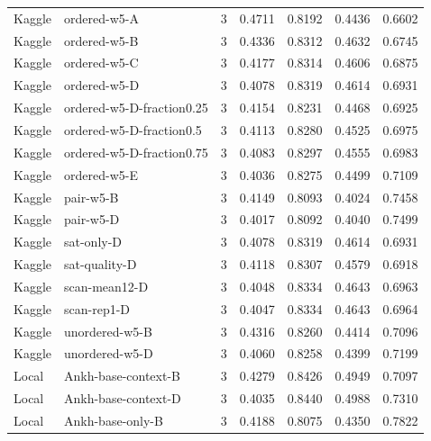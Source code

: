 \begin{longtable}{@{}P{1.35cm}P{5.3cm}rrrrr@{}}
Kaggle & ordered-\allowbreak{}w5-\allowbreak{}A & 3 & 0.4711 & 0.8192 & 0.4436 & 0.6602 \\
Kaggle & ordered-\allowbreak{}w5-\allowbreak{}B & 3 & 0.4336 & 0.8312 & 0.4632 & 0.6745 \\
Kaggle & ordered-\allowbreak{}w5-\allowbreak{}C & 3 & 0.4177 & 0.8314 & 0.4606 & 0.6875 \\
Kaggle & ordered-\allowbreak{}w5-\allowbreak{}D & 3 & 0.4078 & 0.8319 & 0.4614 & 0.6931 \\
Kaggle & ordered-\allowbreak{}w5-\allowbreak{}D-\allowbreak{}fraction0.25 & 3 & 0.4154 & 0.8231 & 0.4468 & 0.6925 \\
Kaggle & ordered-\allowbreak{}w5-\allowbreak{}D-\allowbreak{}fraction0.5 & 3 & 0.4113 & 0.8280 & 0.4525 & 0.6975 \\
Kaggle & ordered-\allowbreak{}w5-\allowbreak{}D-\allowbreak{}fraction0.75 & 3 & 0.4083 & 0.8297 & 0.4555 & 0.6983 \\
Kaggle & ordered-\allowbreak{}w5-\allowbreak{}E & 3 & 0.4036 & 0.8275 & 0.4499 & 0.7109 \\
Kaggle & pair-\allowbreak{}w5-\allowbreak{}B & 3 & 0.4149 & 0.8093 & 0.4024 & 0.7458 \\
Kaggle & pair-\allowbreak{}w5-\allowbreak{}D & 3 & 0.4017 & 0.8092 & 0.4040 & 0.7499 \\
Kaggle & sat-\allowbreak{}only-\allowbreak{}D & 3 & 0.4078 & 0.8319 & 0.4614 & 0.6931 \\
Kaggle & sat-\allowbreak{}quality-\allowbreak{}D & 3 & 0.4118 & 0.8307 & 0.4579 & 0.6918 \\
Kaggle & scan-\allowbreak{}mean12-\allowbreak{}D & 3 & 0.4048 & 0.8334 & 0.4643 & 0.6963 \\
Kaggle & scan-\allowbreak{}rep1-\allowbreak{}D & 3 & 0.4047 & 0.8334 & 0.4643 & 0.6964 \\
Kaggle & unordered-\allowbreak{}w5-\allowbreak{}B & 3 & 0.4316 & 0.8260 & 0.4414 & 0.7096 \\
Kaggle & unordered-\allowbreak{}w5-\allowbreak{}D & 3 & 0.4060 & 0.8258 & 0.4399 & 0.7199 \\
Local & Ankh-\allowbreak{}base-\allowbreak{}context-\allowbreak{}B & 3 & 0.4279 & 0.8426 & 0.4949 & 0.7097 \\
Local & Ankh-\allowbreak{}base-\allowbreak{}context-\allowbreak{}D & 3 & 0.4035 & 0.8440 & 0.4988 & 0.7310 \\
Local & Ankh-\allowbreak{}base-\allowbreak{}only-\allowbreak{}B & 3 & 0.4188 & 0.8075 & 0.4350 & 0.7822 \\

\end{longtable}
